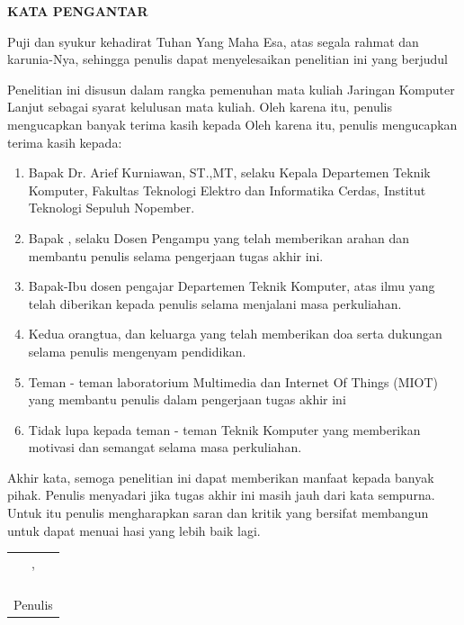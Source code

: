 \begin{center}
	\Large
	\textbf{KATA PENGANTAR}
\end{center}


\vspace{2ex}


Puji dan syukur kehadirat Tuhan Yang Maha Esa, atas segala rahmat dan karunia-Nya, sehingga penulis dapat menyelesaikan penelitian ini yang berjudul \tatitle

Penelitian ini disusun dalam rangka pemenuhan mata kuliah Jaringan Komputer Lanjut sebagai syarat kelulusan mata kuliah. Oleh karena itu, penulis mengucapkan banyak terima kasih kepada Oleh karena itu, penulis mengucapkan terima kasih kepada:

\begin{enumerate}[nolistsep]
	\item Bapak Dr. Arief Kurniawan, ST.,MT, selaku Kepala Departemen Teknik Komputer, Fakultas Teknologi Elektro dan Informatika Cerdas, Institut Teknologi Sepuluh Nopember.
	\item Bapak \advisor, selaku Dosen Pengampu yang telah memberikan arahan dan membantu penulis selama pengerjaan tugas akhir ini.
	\item Bapak-Ibu dosen pengajar Departemen Teknik Komputer, atas ilmu yang telah diberikan kepada penulis selama menjalani masa perkuliahan.
	\item Kedua orangtua, dan keluarga yang telah memberikan doa serta dukungan selama penulis mengenyam pendidikan.
	\item Teman - teman laboratorium Multimedia dan Internet Of Things (MIOT) yang membantu penulis dalam pengerjaan tugas akhir ini
	\item Tidak lupa kepada teman - teman Teknik Komputer yang memberikan motivasi dan semangat selama masa perkuliahan.
	
	
\end{enumerate}

Akhir kata, semoga penelitian ini dapat memberikan manfaat kepada banyak pihak. Penulis menyadari jika tugas akhir ini masih jauh dari kata sempurna. Untuk itu penulis mengharapkan saran dan kritik yang bersifat membangun untuk dapat menuai hasi yang lebih baik lagi.

\begin{flushright}
	\begin{tabular}[b]{c}
		\place{}, \MONTH{} \the\year{} \\
		\\
		\\
		\\
		\\
		Penulis
	\end{tabular}
\end{flushright}
